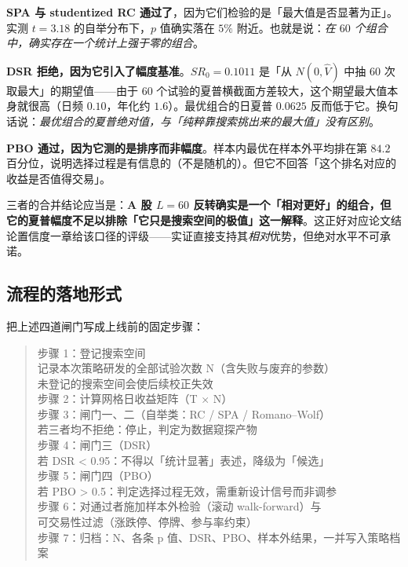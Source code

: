 \textbf{SPA 与 studentized RC 通过了}，因为它们检验的是「最大值是否显著为正」。实测 $t=3.18$ 的自举分布下，$p$ 值确实落在 $5\%$ 附近。也就是说：\emph{在 $60$ 个组合中，确实存在一个统计上强于零的组合}。

\textbf{DSR 拒绝，因为它引入了幅度基准}。$SR_0=0.1011$ 是「从 $N(0,\hat V)$ 中抽 $60$ 次取最大」的期望值——由于 $60$ 个试验的夏普横截面方差较大，这个期望最大值本身就很高（日频 $0.10$，年化约 $1.6$）。最优组合的日夏普 $0.0625$ 反而低于它。换句话说：\emph{最优组合的夏普绝对值，与「纯粹靠搜索挑出来的最大值」没有区别}。

\textbf{PBO 通过，因为它测的是排序而非幅度}。样本内最优在样本外平均排在第 $84.2$ 百分位，说明选择过程是有信息的（不是随机的）。但它不回答「这个排名对应的收益是否值得交易」。

三者的合并结论应当是：\textbf{A 股 $L=60$ 反转确实是一个「相对更好」的组合，但它的夏普幅度不足以排除「它只是搜索空间的极值」这一解释}。这正好对应论文结论置信度一章给该口径的评级——实证直接支持其\emph{相对}优势，但绝对水平不可承诺。

\subsection{流程的落地形式}

把上述四道闸门写成上线前的固定步骤：

\begin{quote}\ttfamily\small
步骤 1：登记搜索空间\\
\quad 记录本次策略研发的全部试验次数 N（含失败与废弃的参数）\\
\quad 未登记的搜索空间会使后续校正失效\\
步骤 2：计算网格日收益矩阵（T × N）\\
步骤 3：闸门一、二（自举类：RC / SPA / Romano--Wolf）\\
\quad 若三者均不拒绝：停止，判定为数据窥探产物\\
步骤 4：闸门三（DSR）\\
\quad 若 DSR < 0.95：不得以「统计显著」表述，降级为「候选」\\
步骤 5：闸门四（PBO）\\
\quad 若 PBO > 0.5：判定选择过程无效，需重新设计信号而非调参\\
步骤 6：对通过者施加样本外检验（滚动 walk-forward）与\\
\quad 可交易性过滤（涨跌停、停牌、参与率约束）\\
步骤 7：归档：N、各条 p 值、DSR、PBO、样本外结果，一并写入策略档案
\end{quote}

